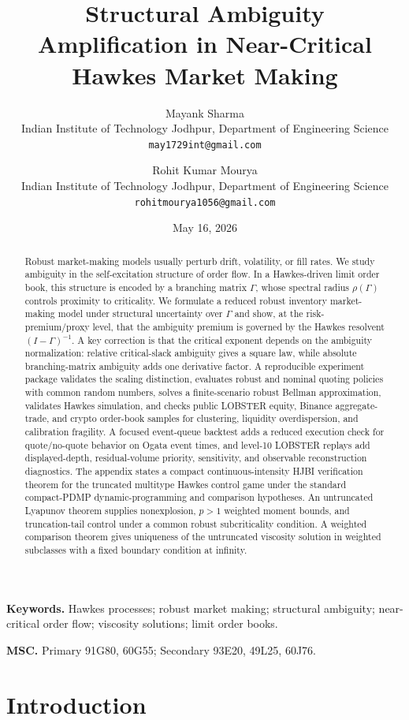 \documentclass[11pt]{article}
\title{Structural Ambiguity Amplification in Near-Critical Hawkes Market Making}
\author{Mayank Sharma\\
Indian Institute of Technology Jodhpur, Department of Engineering Science\\
\texttt{may1729int@gmail.com}
\and
Rohit Kumar Mourya\\
Indian Institute of Technology Jodhpur, Department of Engineering Science\\
\texttt{rohitmourya1056@gmail.com}}
\date{May 16, 2026}
\begin{document}
\maketitle

\begin{abstract}
Robust market-making models usually perturb drift, volatility, or fill rates.
We study ambiguity in the self-excitation structure of order flow. In a
Hawkes-driven limit order
book, this structure is encoded by a branching matrix $\Gamma$, whose spectral
radius $\rho(\Gamma)$ controls proximity to criticality. We formulate a reduced
robust inventory market-making model under structural uncertainty over
$\Gamma$ and show, at the risk-premium/proxy level, that the ambiguity premium
is governed by the Hawkes resolvent $(I-\Gamma)^{-1}$. A key correction is that
the critical exponent depends on the ambiguity normalization: relative
critical-slack ambiguity gives a square law, while absolute branching-matrix
ambiguity adds one derivative factor. A reproducible experiment package
validates the scaling distinction, evaluates robust and nominal quoting
policies with common random numbers, solves a finite-scenario robust Bellman
approximation, validates Hawkes simulation, and checks public LOBSTER equity,
Binance aggregate-trade, and crypto order-book samples
for clustering, liquidity overdispersion, and calibration fragility. A focused
event-queue backtest adds a reduced execution check for quote/no-quote
behavior on Ogata event times, and level-10 LOBSTER replays add displayed-depth,
residual-volume priority, sensitivity, and observable reconstruction
diagnostics. The appendix states a compact continuous-intensity HJBI
verification theorem for the truncated multitype Hawkes control game under the
standard compact-PDMP dynamic-programming and comparison hypotheses. An
untruncated Lyapunov theorem supplies
nonexplosion, $p>1$ weighted moment bounds, and truncation-tail control under a
common robust subcriticality condition. A weighted comparison theorem gives
uniqueness of the untruncated viscosity solution in weighted subclasses with a
fixed boundary condition at infinity.
\end{abstract}

\noindent\textbf{Keywords.}
Hawkes processes; robust market making; structural ambiguity; near-critical
order flow; viscosity solutions; limit order books.

\medskip
\noindent\textbf{MSC.}
Primary 91G80, 60G55; Secondary 93E20, 49L25, 60J76.

\section{Introduction}
\end{document}
